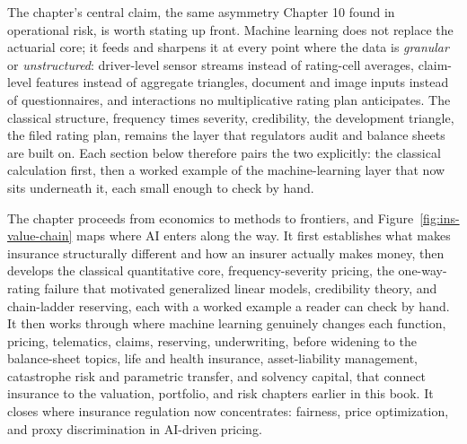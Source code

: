 \documentclass[../ai_in_finance]{subfiles}
\begin{document}
The chapter's central claim, the same asymmetry Chapter 10 found in operational risk, is worth stating up front. Machine learning does not replace the actuarial core; it feeds and sharpens it at every point where the data is \emph{granular} or \emph{unstructured}: driver-level sensor streams instead of rating-cell averages, claim-level features instead of aggregate triangles, document and image inputs instead of questionnaires, and interactions no multiplicative rating plan anticipates. The classical structure, frequency times severity, credibility, the development triangle, the filed rating plan, remains the layer that regulators audit and balance sheets are built on. Each section below therefore pairs the two explicitly: the classical calculation first, then a worked example of the machine-learning layer that now sits underneath it, each small enough to check by hand.

The chapter proceeds from economics to methods to frontiers, and Figure~\ref{fig:ins-value-chain} maps where AI enters along the way. It first establishes what makes insurance structurally different and how an insurer actually makes money, then develops the classical quantitative core, frequency-severity pricing, the one-way-rating failure that motivated generalized linear models, credibility theory, and chain-ladder reserving, each with a worked example a reader can check by hand. It then works through where machine learning genuinely changes each function, pricing, telematics, claims, reserving, underwriting, before widening to the balance-sheet topics, life and health insurance, asset-liability management, catastrophe risk and parametric transfer, and solvency capital, that connect insurance to the valuation, portfolio, and risk chapters earlier in this book. It closes where insurance regulation now concentrates: fairness, price optimization, and proxy discrimination in AI-driven pricing.
\end{document}
